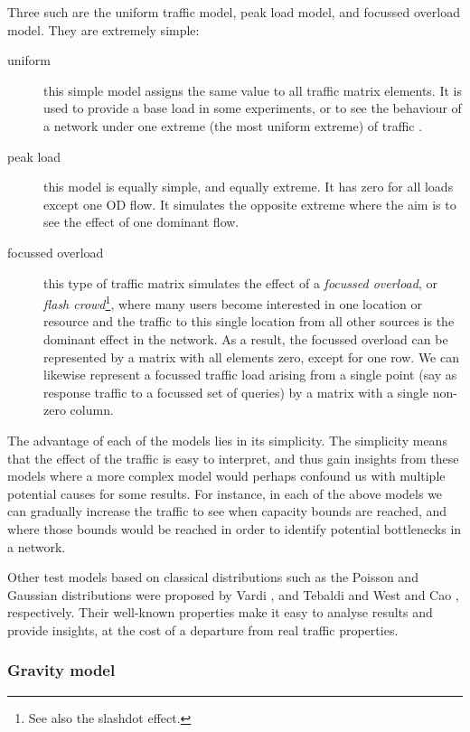 Three such are the uniform traffic model, peak load model, and
focussed overload model. They are extremely simple:
\begin{description}
\item[uniform] this simple model assigns the same value to all
  traffic matrix elements. It is used to provide a base load in some
  experiments, or to see the behaviour of a network under one extreme
  (the most uniform extreme) of traffic \cite[Chapter 4.5.1]{Cahn98WANDesign}.

\item[peak load] this model is equally simple, and equally extreme. It
  has zero for all loads except one OD flow. It simulates the opposite
  extreme where the aim is to see the effect of one dominant flow.

\item[focussed overload] this type of traffic matrix simulates the effect of a
  {\em focussed overload}, or {\em flash crowd}\footnote{See also the
    slashdot effect.}, where many users become interested in one
  location or resource and the traffic to this single location from
  all other sources is the dominant effect in the network. As a
  result, the focussed overload can be represented by a matrix with all
  elements zero, except for one row. We can likewise represent a
  focussed traffic load arising from a single point (say as response
  traffic to a focussed set of queries) by a matrix with a single
  non-zero column.
\end{description}
The advantage of each of the models lies in its simplicity. The
simplicity means that the effect of the traffic is easy to interpret,
and thus gain insights from these models where a more complex
model would perhaps confound us with multiple potential causes for
some results. For instance, in each of the above models we can
gradually increase the traffic to see when capacity bounds are
reached, and where those bounds would be reached in order to identify
potential bottlenecks in a network.

Other test models based on classical distributions such as the Poisson
and Gaussian distributions were proposed by Vardi \cite{Vardi96Tomo},
and Tebaldi and West \cite{Tebaldi98Tomo} and Cao \etal 
\cite{Cao00Tomo}, respectively. Their well-known properties make it easy
to analyse results and provide insights, at the cost of a departure from 
real traffic properties.

\subsubsection{Gravity model}

